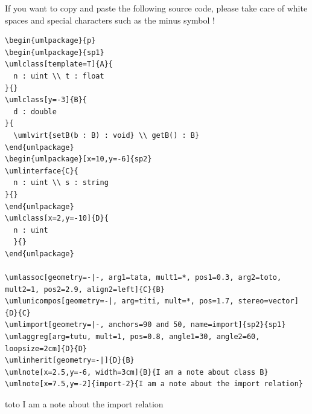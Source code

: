 \documentclass[a4paper,11pt, svgnames]{article}
\date{}
\title{}
\author{}
\begin{document}
\maketitle

If you want to copy and paste the following source code, please take care of white spaces and special characters such as the minus symbol !

\medskip
\lstset{breaklines=true, frame=trBL, language=tikzuml}
\begin{lstlisting}
\begin{umlpackage}{p}
\begin{umlpackage}{sp1}
\umlclass[template=T]{A}{
  n : uint \\ t : float
}{}
\umlclass[y=-3]{B}{
  d : double
}{
  \umlvirt{setB(b : B) : void} \\ getB() : B}
\end{umlpackage}
\begin{umlpackage}[x=10,y=-6]{sp2}
\umlinterface{C}{
  n : uint \\ s : string
}{}
\end{umlpackage}
\umlclass[x=2,y=-10]{D}{
  n : uint
  }{}
\end{umlpackage}

\umlassoc[geometry=-|-, arg1=tata, mult1=*, pos1=0.3, arg2=toto, mult2=1, pos2=2.9, align2=left]{C}{B}
\umlunicompos[geometry=-|, arg=titi, mult=*, pos=1.7, stereo=vector]{D}{C}
\umlimport[geometry=|-, anchors=90 and 50, name=import]{sp2}{sp1}
\umlaggreg[arg=tutu, mult=1, pos=0.8, angle1=30, angle2=60, loopsize=2cm]{D}{D}
\umlinherit[geometry=-|]{D}{B}
\umlnote[x=2.5,y=-6, width=3cm]{B}{I am a note about class B}
\umlnote[x=7.5,y=-2]{import-2}{I am a note about the import relation}
\end{lstlisting}

\begin{SaveVerbatim}{toto}
I am a note
about the
import relation
\end{SaveVerbatim}
\end{document}
